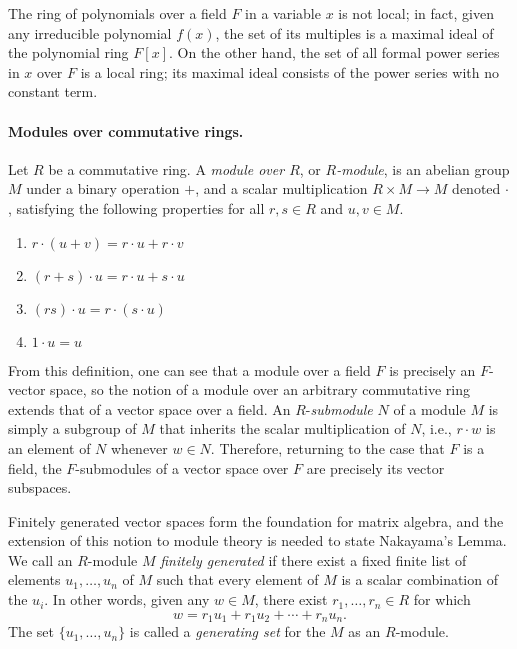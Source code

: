 \documentclass{article}
\begin{document}
The ring of polynomials over a field $F$ in a variable $x$ is not local; in
fact, given any irreducible polynomial $f(x)$, the set of its multiples is a
maximal ideal of the polynomial ring $F[x]$. On the other hand, the set of all
formal power series  in $x$ over $F$ is a local ring; its maximal ideal
consists of the power series with no constant term. 


\paragraph{Modules over commutative rings.}
Let  $R$ be a commutative ring. 
A \emph{module over $R$}, or \emph{$R$-module}, is an abelian group $M$ under a
binary operation $+$, and a {scalar multiplication} $R \times M \to M$ denoted
$\cdot$, satisfying the following properties for all $r, s \in R$
and $u, v \in M$.

\begin{enumerate}[leftmargin=5cm,topsep=0cm,itemsep=0cm]
  \item  $r \cdot (u + v)  = r \cdot u + r \cdot v$
  \item $(r+s) \cdot u = r \cdot u + s \cdot u$
  \item $(rs) \cdot u = r \cdot (s \cdot u)$
  \item $1 \cdot u = u$ 
\end{enumerate}

From this definition, one can see that a module over a field $F$ is precisely
an $F$-vector space, so the notion of a module over an arbitrary commutative
ring extends that of a vector space over a field. 
An $R$-\emph{submodule} $N$ of a module $M$ is simply a subgroup of $M$ that inherits 
the scalar multiplication of $N$, i.e., $r \cdot w$ is an element of $N$ whenever $w \in N$.
Therefore, returning to the case that $F$ is a field,
the $F$-submodules of a vector space over $F$ are precisely its vector subspaces. 


Finitely generated vector spaces form the foundation for matrix algebra, and the extension of this notion
to module theory is needed to state Nakayama's Lemma. We call an $R$-module
$M$ \emph{finitely generated} if there exist a fixed finite list of elements
$u_1, \ldots, u_n$ of $M$ such that every element of $M$ is a scalar combination 
of the $u_i$.  In other words, 
given any  $w \in M$,
there exist $r_1, \ldots, r_n \in R$ for which  
\[w = r_1 u_1 + r_1 u_2 + \cdots + r_n u_n\text{.}\]
The set $\{u_1, \ldots, u_n\}$ is called a \emph{generating set} for the $M$ as
an $R$-module. 
\end{document}
